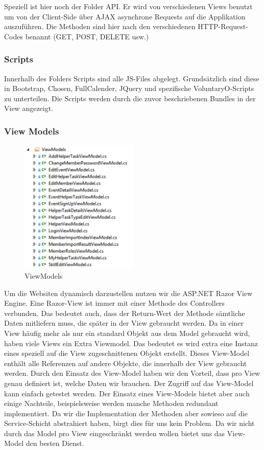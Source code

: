 			Speziell ist hier noch der Folder API. Er wird von verschiedenen Views benutzt um von der Client-Side über AJAX asynchrone Requests auf die Applikation auszuführen. Die Methoden sind hier nach den verschiedenen HTTP-Request-Codes benannt (GET, POST, DELETE usw.)

		\subsubsection{Scripts}
			Innerhalb des Folders Scripts sind alle JS-Files abgelegt. Grundsätzlich sind diese in Bootstrap, Chosen, FullCalender, JQuery und spezifische VoluntaryO-Scripts zu unterteilen. Die Scripts werden durch die zuvor beschriebenen Bundles in der View angezeigt.

		\subsubsection{View Models}

			\begin{figure}[H]
		    	\centering
		    	 \includegraphics[width=0.5\textwidth]{content/architekturdokumentation/images/web-3-ViewModels.png}
				\caption{ViewModels}
			\end{figure}

			Um die Websiten dynamisch darzustellen nutzen wir die ASP.NET Razor View Engine. Eine Razor-View ist immer mit einer Methode des Controllers verbunden. Das bedeutet auch, dass der Return-Wert der Methode sämtliche Daten mitliefern muss, die später in der View gebraucht werden. Da in einer View häufig mehr als nur ein standard Objekt aus dem Model gebraucht wird, haben viele Views ein Extra Viewmodel. Das bedeutet es wird extra eine Instanz eines speziell auf die View zugeschnittenen Objekt erstellt. Dieses View-Model enthält alle Referenzen auf andere Objekte, die innerhalb der View gebraucht werden. Durch den Einsatz des View-Model haben wir den Vorteil, dass pro View genau definiert ist, welche Daten wir brauchen. Der Zugriff auf das View-Model kann einfach getestet werden. Der Einsatz eines View-Models bietet aber auch einige Nachteile, beispielsweise werden manche Methoden redundant implementiert. Da wir die Implementation der Methoden aber sowieso auf die Service-Schicht abstrahiert haben, birgt dies für uns kein Problem. Da wir nicht durch das Model pro View eingeschränkt werden wollen bietet uns das View-Model den besten Dienst.

